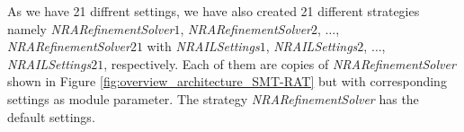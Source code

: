 \noindent As we have 21 diffrent settings, we have also created 21 different strategies namely \textit{NRARefinementSolver$1$}, \textit{NRARefinementSolver$2$}, $\dots$, \textit{NRARefinementSolver$21$} with \textit{NRAILSettings$1$}, \textit{NRAILSettings$2$}, $\dots$, \textit{NRAILSettings$21$}, respectively.
Each of them are copies of \textit{NRARefinementSolver} shown in Figure \ref{fig:overview_architecture_SMT-RAT} but with corresponding settings as module parameter.
The strategy \textit{NRARefinementSolver} has the default settings.\newline